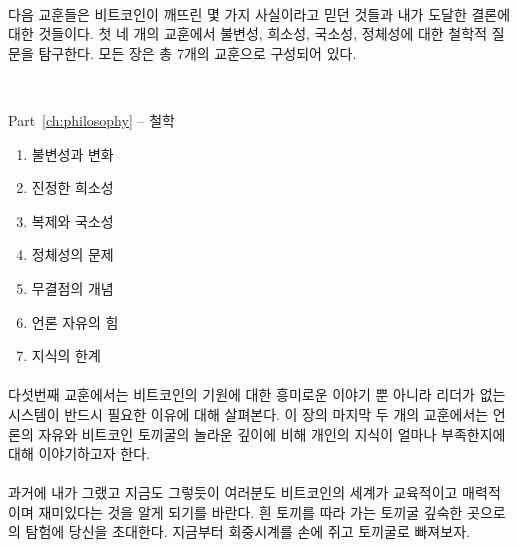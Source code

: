 \paragraph{}
다음 교훈들은 비트코인이 깨뜨린 몇 가지 사실이라고 믿던 것들과 내가 도달한 결론에 대한 것들이다. 
첫 네 개의 교훈에서 불변성, 희소성, 국소성, 정체성에 대한 철학적 질문을 탐구한다. 
모든 장은 총 7개의 교훈으로 구성되어 있다.

~

\begin{samepage}
	Part~\ref{ch:philosophy} -- 철학
	
	\begin{enumerate}
		\item 불변성과 변화
		\item 진정한 희소성
		\item 복제와 국소성
		\item 정체성의 문제
		\item 무결점의 개념
		\item 언론 자유의 힘
		\item 지식의 한계
	\end{enumerate}
\end{samepage}

\paragraph{}
다섯번째 교훈에서는 비트코인의 기원에 대한 흥미로운 이야기 뿐 아니라 리더가 없는 시스템이 반드시 필요한 이유에 대해 살펴본다. 
이 장의 마지막 두 개의 교훈에서는 언론의 자유와 비트코인 토끼굴의 놀라운 깊이에 비해 개인의 지식이 얼마나 부족한지에 대해 이야기하고자 한다. 
 
\paragraph{}
과거에 내가 그랬고 지금도 그렇듯이 여러분도 비트코인의 세계가 교육적이고 매력적이며 재미있다는 것을 알게 되기를 바란다. 
흰 토끼를 따라 가는 토끼굴 깊숙한 곳으로의 탐험에 당신을 초대한다. 지금부터 회중시계를 손에 쥐고 토끼굴로 빠져보자.

